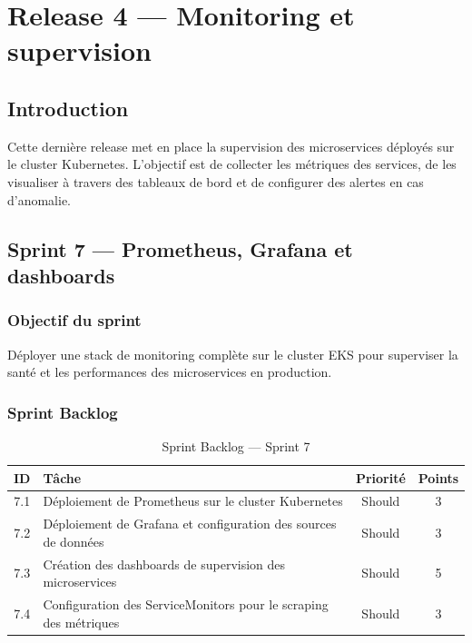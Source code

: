 \chapter{Release 4 --- Monitoring et supervision}

\section*{Introduction}
Cette dernière release met en place la supervision des microservices déployés sur le cluster Kubernetes. L'objectif est de collecter les métriques des services, de les visualiser à travers des tableaux de bord et de configurer des alertes en cas d'anomalie.

\section{Sprint 7 --- Prometheus, Grafana et dashboards}

\subsection{Objectif du sprint}
Déployer une stack de monitoring complète sur le cluster EKS pour superviser la santé et les performances des microservices en production.

\subsection{Sprint Backlog}

\begin{table}[H]
\centering
\renewcommand{\arraystretch}{1.2}
\begin{tabular}{|c|p{9cm}|c|c|}
\hline
\textbf{ID} & \textbf{Tâche} & \textbf{Priorité} & \textbf{Points} \\
\hline
7.1 & Déploiement de Prometheus sur le cluster Kubernetes & Should & 3 \\
\hline
7.2 & Déploiement de Grafana et configuration des sources de données & Should & 3 \\
\hline
7.3 & Création des dashboards de supervision des microservices & Should & 5 \\
\hline
7.4 & Configuration des ServiceMonitors pour le scraping des métriques & Should & 3 \\
\hline
\end{tabular}
\caption{Sprint Backlog --- Sprint 7}
\label{tab:sprint7_backlog}
\end{table}

